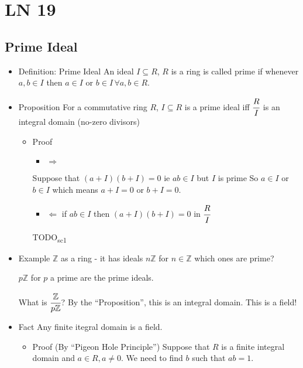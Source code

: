 \documentclass[11pt]{article}
\author{Fanping}
\date{\today}
\title{}
\begin{document}
\tableofcontents

\setcounter{secnumdepth}{-1}
\section{LN 19}
\label{sec:org979f7b4}
\subsection{Prime Ideal}
\label{sec:org942a1d9}
\begin{itemize}
\item Definition: Prime Ideal
An ideal \(I \subseteq R\), \(R\) is a ring is called prime
if whenever \(a, b \in I\) then \(a \in I\) or \(b \in I \,\forall a, b \in R\).

\item Proposition
For a commutative ring \(R\), \(I \subseteq R\) is a prime ideal iff \(\cfrac{R}{I}\)
is an integral domain (no-zero divisors)
\begin{itemize}
\item Proof
\begin{itemize}
\item \(\Rightarrow\)
\end{itemize}
Suppose that \((a + I) (b + I) = 0\) ie \(ab \in I\) but \(I\) is prime
So \(a \in I\) or \(b \in I\) which means \(a + I = 0\) or \(b + I = 0\).

\begin{itemize}
\item \(\Leftarrow\) if \(ab \in I\) then \((a + I)(b + I) = 0\) in $\cfrac{R}{I}$
\end{itemize}
TODO\textsubscript{sc1}
\end{itemize}

\item Example
\(\mathbb{Z}\) as a ring - it has ideals \(n\mathbb{Z}\) for \(n \in \mathbb{Z}\)
which ones are prime?

\(p\mathbb{Z}\) for \(p\) a prime are the prime ideals.

What is \(\cfrac{\mathbb{Z}}{p\mathbb{Z}}\)?
By the ``Proposition'', this is an integral domain. This is a field!

\item Fact
Any finite itegral domain is a field.
\begin{itemize}
\item Proof (By ``Pigeon Hole Principle'')
Suppose that \(R\) is a finite integral domain and \(a \in R, a \neq 0\).
We need to find \(b\) such that \(ab = 1\).


\end{itemize}
\end{itemize}
\end{document}
